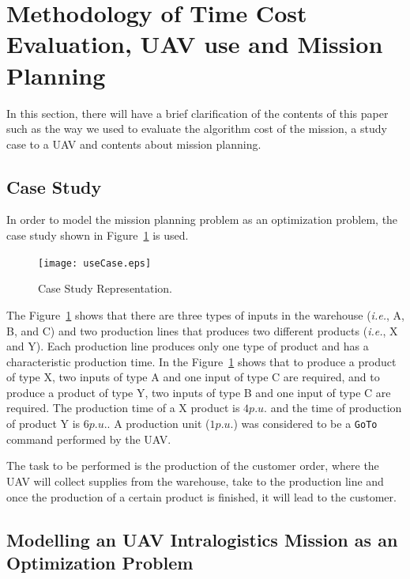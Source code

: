 \documentclass[conference,harvard,brazil,english]{sbatex}
\newcommand{\commentib}[1]{{\color{blue} [IB: #1]}}
\begin{document}
\section{Methodology of Time Cost Evaluation, UAV use and Mission Planning}
\label{sec:method}


In this section, there will have a brief clarification of the contents of this paper such as the way we used to evaluate the algorithm cost of the mission, a study case to a UAV and contents about mission planning.

\subsection{Case Study}
\label{sec:ec}

In order to model the mission planning problem as an optimization problem, the case study shown in Figure~\ref{fig:useCase} is used.

\begin{figure}[ht]
	\centering
	\texttt{[image: useCase.eps]}
	\caption{Case Study Representation.\label{fig:useCase}}
\end{figure}


	
The Figure~\ref{fig:useCase} shows that there are three types of inputs in the warehouse ({\it i.e.}, A, B, and C) and two production lines that produces two different products ({\it i.e.}, X and Y). Each production line produces only one type of product and has a characteristic production time.  In the Figure~\ref{fig:useCase} shows that to produce a product of type X, two inputs of type A and one input of type C are required, and to produce a product of type Y, two inputs of type B and one input of type C are required. The production time of a X product is $4 p.u.$ and the time of production of product Y is $6 p.u.$. A production unit ($1 p.u.$) was considered to be a \texttt{GoTo} command performed by the UAV.

The task to be performed is the production of the customer order, where the UAV will collect supplies from the warehouse, take to the production line and once the production of a certain product is finished, it will lead to the customer.

\subsection{Modelling an UAV Intralogistics Mission as an Optimization Problem }
\label{ssec:modelo}
\end{document}
